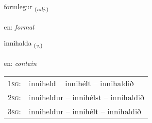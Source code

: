 \documentclass[frontgrid, backgrid]{flacards}\usepackage[]{graphicx}\usepackage[]{color}
\begin{document}
\renewcommand{\flhead}{\vskip5pt \fboxsep=0pt {\small\bfseries\footnotesize Lýsingarorð | Adjective}}
\renewcommand{\fcfoot}{\vskip5pt \fboxsep=0pt \hspace{2pt}{\small\bfseries\footnotesize 2K}}

\renewcommand{\blhead}{\vskip5pt {\small\bfseries\footnotesize Lýsingarorð | Adjective }}
\renewcommand{\bcfoot}{\vskip5pt \hspace{2pt}{\small\bfseries\footnotesize 2K}}


{formlegur \small{\textsubscript{(\textit{adj.})}} \\[1ex] %
\textphonetic{[fɔrmlɛɣʏr]} \\
en: \emph{formal} \\  [2ex]
\renewcommand*{\arraystretch}{0.8}
}

\renewcommand{\flhead}{\vskip5pt \fboxsep=0pt {\small\bfseries\footnotesize Sagnorð | Verb}}
\renewcommand{\fcfoot}{\vskip5pt \fboxsep=0pt \hspace{2pt}{\small\bfseries\footnotesize 2K}}

\renewcommand{\blhead}{\vskip5pt {\small\bfseries\footnotesize Sagnorð | Verb }}
\renewcommand{\bcfoot}{\vskip5pt \hspace{2pt}{\small\bfseries\footnotesize 2K}}


{innihalda \small{\textsubscript{(\textit{v.})}} \\[1ex] %
\textphonetic{[ɪnɪhalta]} \\
en: \emph{contain} \\  [2ex]
\renewcommand*{\arraystretch}{0.8}
\begin{tabular}{p{1cm}l}
\textsc{1sg}: & inniheld -- innihélt -- innihaldið \\ 
\textsc{2sg}: & inniheldur -- innihélst -- innihaldið \\ 
\textsc{3sg}: & inniheldur -- innihélt -- innihaldið \\ 
\end{tabular}
}
\end{document}
